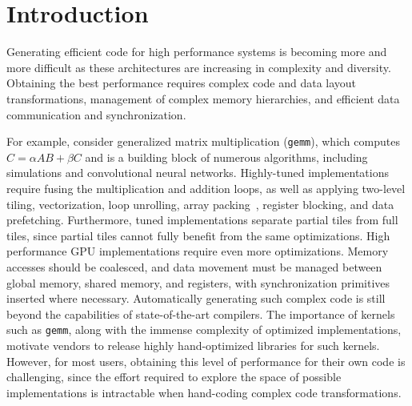\vspace{-0.25cm}
\section{Introduction}
\label{sec:intro}

Generating efficient code for high performance systems is becoming more and more difficult as these architectures are increasing in complexity and diversity.
Obtaining the best performance requires complex code and data layout transformations, management of complex memory hierarchies, and efficient data communication and synchronization.

For example, consider generalized matrix multiplication (\texttt{gemm}), which computes $C = \alpha AB + \beta C$ and is a
building block of numerous algorithms, including simulations and convolutional neural networks.  Highly-tuned implementations
require fusing the multiplication and addition loops, as well as applying two-level tiling, vectorization, loop unrolling, array packing~\cite{Goto:2008:AHM:1356052.1356053},
register blocking, and data prefetching.  Furthermore, tuned implementations separate partial tiles from full tiles, since partial tiles cannot fully benefit from the same optimizations.
High performance GPU implementations require even more optimizations.  Memory accesses should be coalesced, and data movement must be managed between global memory, shared memory, and registers, with synchronization primitives inserted where necessary.
Automatically generating such complex code is still beyond the capabilities of state-of-the-art compilers.
The importance of kernels such as \texttt{gemm}, along with the immense complexity of optimized implementations, motivate vendors to release highly hand-optimized libraries for such kernels.  However, for most users, obtaining this level of performance for their own code is challenging, since the effort required to explore the space of possible implementations is intractable when hand-coding complex code transformations.

